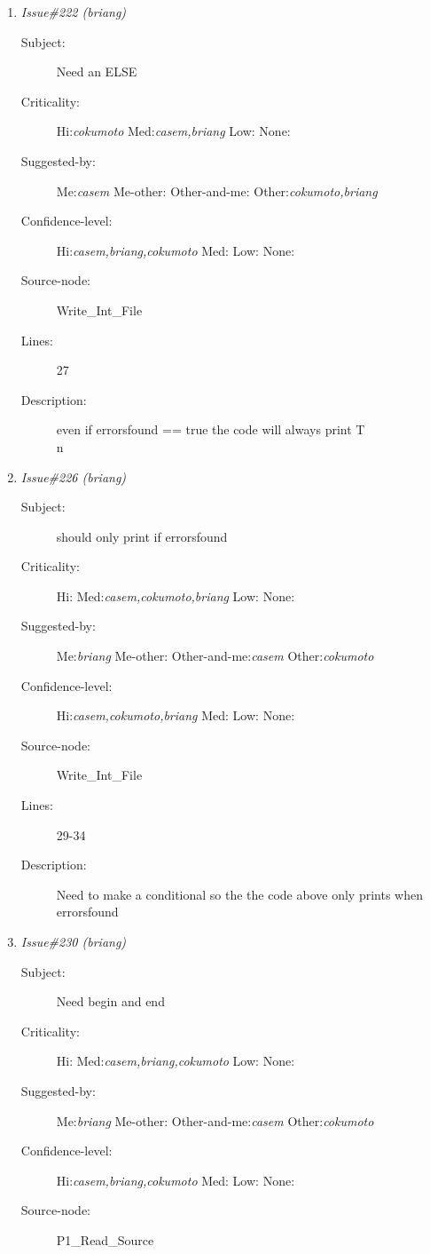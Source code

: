 \begin{enumerate}
\begin{description}
\item [Lines:] 52-55

\item [Description:] If the table is full the searching needs to be
set to false so that an INF loop will not crash program
\end{description}
\item {\it Issue\#222 (briang)}
\begin{description}
\item [Subject:] Need an ELSE
\item [Criticality:] Hi:{\it cokumoto} Med:{\it casem,briang} Low:{\it } None:{\it }
\item [Suggested-by:] Me:{\it casem} Me-other:{\it } Other-and-me:{\it } Other:{\it cokumoto,briang}
\item [Confidence-level:] Hi:{\it casem,briang,cokumoto} Med:{\it } Low:{\it } None:{\it }
\item [Source-node:] Write\_Int\_File

\item [Lines:] 27

\item [Description:] even if errorsfound == true the code will
always print T\\n
\end{description}
\item {\it Issue\#226 (briang)}
\begin{description}
\item [Subject:] should only print if errorsfound
\item [Criticality:] Hi:{\it } Med:{\it casem,cokumoto,briang} Low:{\it } None:{\it }
\item [Suggested-by:] Me:{\it briang} Me-other:{\it } Other-and-me:{\it casem} Other:{\it cokumoto}
\item [Confidence-level:] Hi:{\it casem,cokumoto,briang} Med:{\it } Low:{\it } None:{\it }
\item [Source-node:] Write\_Int\_File

\item [Lines:] 29-34

\item [Description:] Need to make a conditional so the the code
above only prints when errorsfound
\end{description}
\item {\it Issue\#230 (briang)}
\begin{description}
\item [Subject:] Need begin and end
\item [Criticality:] Hi:{\it } Med:{\it casem,briang,cokumoto} Low:{\it } None:{\it }
\item [Suggested-by:] Me:{\it briang} Me-other:{\it } Other-and-me:{\it casem} Other:{\it cokumoto}
\item [Confidence-level:] Hi:{\it casem,briang,cokumoto} Med:{\it } Low:{\it } None:{\it }
\item [Source-node:] P1\_Read\_Source


\end{description}
\end{enumerate}
